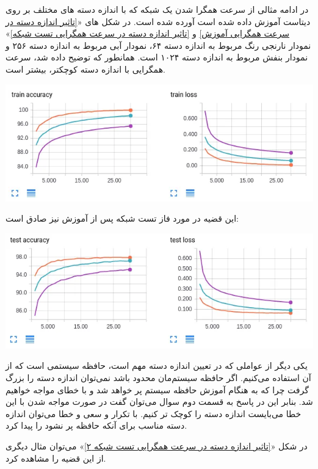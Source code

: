 \begin{qsolve}
	در ادامه مثالی از سرعت همگرا شدن یک شبکه  که با اندازه دسته های مختلف بر روی دیتاست  آموزش داده شده است آورده شده است. در شکل های «\ref{تاثیر اندازه دسته در سرعت همگرایی آموزش} و \ref{تاثیر اندازه دسته در سرعت همگرایی تست شبکه}» نمودار نارنجی رنگ مربوط به اندازه دسته ۶۴، نمودار آبی مربوط به اندازه دسته ۲۵۶ و نمودار بنفش مربوط به اندازه دسته ۱۰۲۴ است. همانطور که توضیح داده شد، سرعت همگرایی با اندازه دسته کوچکتر، بیشتر است.
\end{qsolve}







\begin{qsolve}
	\begin{center}
		\includegraphics*[width=1\linewidth]{pics/img7.png}
		\label{تاثیر اندازه دسته در سرعت همگرایی آموزش}
	\end{center}
	
	این قضیه در مورد فاز تست شبکه پس از آموزش نیز صادق است:
	
	\begin{center}
		\includegraphics*[width=1\linewidth]{pics/img8.png}
		\label{تاثیر اندازه دسته در سرعت همگرایی تست شبکه}
	\end{center}
	
	یکی دیگر از عواملی که در تعیین اندازه دسته مهم است، حافظه سیستمی است که از آن استفاده می‌کنیم. اگر حافظه سیستم‌مان محدود باشد نمی‌توان اندازه دسته را بزرگ گرفت چرا که به هنگام آموزش حافظه سیستم پر خواهد شد و با خطای  مواجه خواهیم شد. بنابر این در پاسخ به قسمت دوم سوال می‌توان گفت در صورت مواجه شدن با این خطا می‌بایست اندازه دسته را کوچک تر کنیم. با تکرار و سعی و خطا می‌توان اندازه دسته مناسب برای آنکه حافظه پر نشود را پیدا کرد.
	
	در شکل «\ref{تاثیر اندازه دسته در سرعت همگرایی تست شبکه ۲}» \cite{ref3} می‌توان مثال دیگری از این قضیه را مشاهده کرد.
	
	
\end{qsolve}




